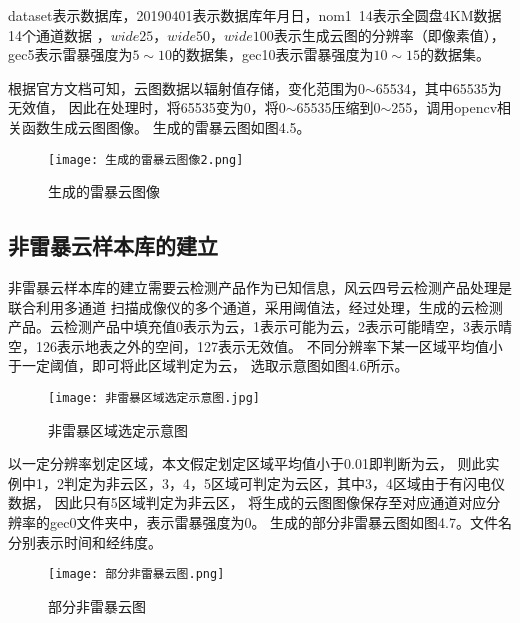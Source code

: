 dataset表示数据库，20190401表示数据库年月日，nom1~14表示全圆盘4KM数据14个通道数据
，$wide25$，$wide50$，$wide100$表示生成云图的分辨率（即像素值），
gec5表示雷暴强度为$5\sim10$的数据集，gec10表示雷暴强度为$10\sim15$的数据集。

根据官方文档可知，云图数据以辐射值存储，变化范围为0$\sim$65534，其中65535为无效值，
因此在处理时，将65535变为0，将0$\sim$65535压缩到0$\sim$255，调用opencv相关函数生成云图图像。
生成的雷暴云图如图4.5。


\iffalse
\begin{figure}[htb]
\centering
\texttt{[image: 云图图像数据层数据官方文档.png]}
\caption{云图图像数据层数据官方文档}
\end{figure}
\fi


\begin{figure}[htb]
    \centering
    \texttt{[image: 生成的雷暴云图像2.png]}
    \caption{生成的雷暴云图像}
\end{figure}


\subsection{非雷暴云样本库的建立}
非雷暴云样本库的建立需要云检测产品作为已知信息，风云四号云检测产品处理是联合利用多通道
扫描成像仪的多个通道，采用阈值法，经过处理，生成的云检测产品。云检测产品中填充值0表示为云，1表示可能为云，2表示可能晴空，3表示晴空，126表示地表之外的空间，127表示无效值。
不同分辨率下某一区域平均值小于一定阈值，即可将此区域判定为云，
选取示意图如图4.6所示。
\begin{figure}[htb]
    \centering
    \texttt{[image: 非雷暴区域选定示意图.jpg]}
    \caption{非雷暴区域选定示意图}
\end{figure}



以一定分辨率划定区域，本文假定划定区域平均值小于0.01即判断为云，
则此实例中1，2判定为非云区，3，4，5区域可判定为云区，其中3，4区域由于有闪电仪数据，
因此只有5区域判定为非云区，
将生成的云图图像保存至对应通道对应分辨率的gec0文件夹中，表示雷暴强度为0。
生成的部分非雷暴云图如图4.7。文件名分别表示时间和经纬度。
\begin{figure}[htb]
    \centering
    \texttt{[image: 部分非雷暴云图.png]}
    \caption{部分非雷暴云图}
\end{figure}


